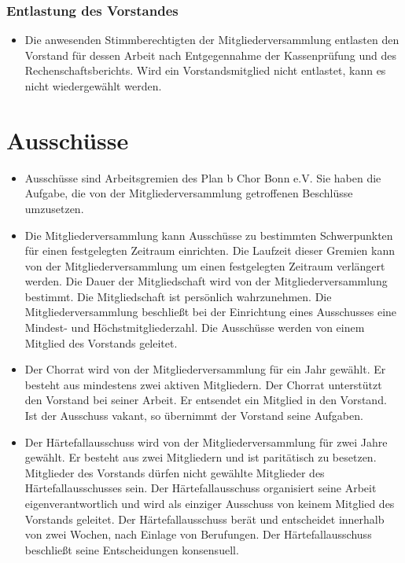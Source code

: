 \documentclass[12pt,paper=a4,ngerman]{report}
\begin{document}
\subsubsection{Entlastung des Vorstandes}

\begin{itemize}
    \item Die anwesenden Stimmberechtigten der Mitgliederversammlung entlasten den Vorstand für dessen Arbeit nach Entgegennahme der Kassenprüfung und des Rechenschaftsberichts. Wird ein Vorstandsmitglied nicht entlastet, kann es nicht wiedergewählt werden.
\end{itemize}

\section{Ausschüsse}

\begin{itemize}
    \item Ausschüsse sind Arbeitsgremien des Plan b Chor Bonn e.V. Sie haben die Aufgabe, die von der Mitgliederversammlung getroffenen Beschlüsse umzusetzen.
    \item Die Mitgliederversammlung kann Ausschüsse zu bestimmten Schwerpunkten für einen festgelegten Zeitraum einrichten. Die Laufzeit dieser Gremien kann von der Mitgliederversammlung um einen festgelegten Zeitraum verlängert werden. Die Dauer der Mitgliedschaft wird von der Mitgliederversammlung bestimmt. Die Mitgliedschaft ist persönlich wahrzunehmen. Die Mitgliederversammlung beschließt bei der Einrichtung eines Ausschusses eine Mindest- und Höchstmitgliederzahl. Die Ausschüsse werden von einem Mitglied des Vorstands geleitet.
    \item Der Chorrat wird von der Mitgliederversammlung für ein Jahr gewählt. Er besteht aus mindestens zwei aktiven Mitgliedern. Der Chorrat unterstützt den Vorstand bei seiner Arbeit. Er entsendet ein Mitglied in den Vorstand. Ist der Ausschuss vakant, so übernimmt der Vorstand seine Aufgaben.
    \item Der Härtefallausschuss wird von der Mitgliederversammlung für zwei Jahre gewählt. Er besteht aus zwei Mitgliedern und ist paritätisch zu besetzen. Mitglieder des Vorstands dürfen nicht gewählte Mitglieder des Härtefallausschusses sein. Der Härtefallausschuss organisiert seine Arbeit eigenverantwortlich und wird als einziger Ausschuss von keinem Mitglied des Vorstands geleitet. Der Härtefallausschuss berät und entscheidet innerhalb von zwei Wochen, nach Einlage von Berufungen. Der Härtefallausschuss beschließt seine Entscheidungen konsensuell.
\end{itemize}
\end{document}
